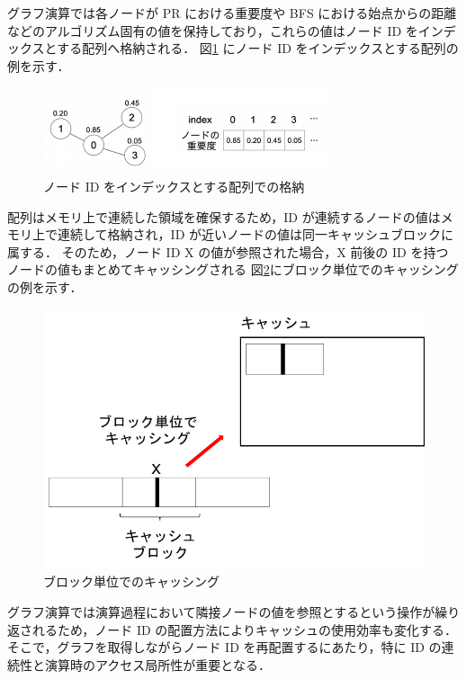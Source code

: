 グラフ演算では各ノードが PR における重要度や BFS における始点からの距離などのアルゴリズム固有の値を保持しており，これらの値はノード ID をインデックスとする配列へ格納される．
図\ref{id_index} にノード ID をインデックスとする配列の例を示す．
\begin{figure}[t]
  \centering
  \includegraphics[width=\linewidth]{./figure/id_index.pdf}
  \caption{ノード ID をインデックスとする配列での格納}
  \label{id_index}
\end{figure}
配列はメモリ上で連続した領域を確保するため，ID が連続するノードの値はメモリ上で連続して格納され，ID が近いノードの値は同一キャッシュブロックに属する．
そのため，ノード ID X の値が参照された場合，X 前後の ID を持つノードの値もまとめてキャッシングされる
図\ref{cache_block}にブロック単位でのキャッシングの例を示す．
\begin{figure}[t]
  \centering
  \includegraphics[scale=1.0]{./figure/cache_block.pdf}
  \caption{ブロック単位でのキャッシング}
  \label{cache_block}
\end{figure}
グラフ演算では演算過程において隣接ノードの値を参照とするという操作が繰り返されるため，ノード ID の配置方法によりキャッシュの使用効率も変化する．
そこで，グラフを取得しながらノード ID を再配置するにあたり，特に ID の連続性と演算時のアクセス局所性が重要となる．
